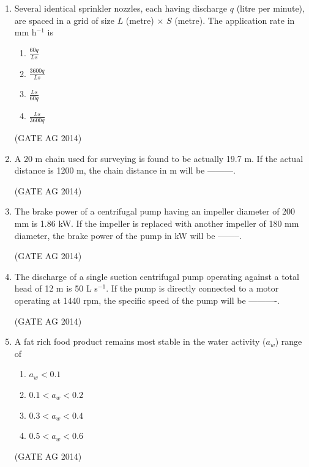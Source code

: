 \documentclass[journal,12pt,onecolumn]{IEEEtran}
\begin{document}
\begin{enumerate}
    \item Several identical sprinkler nozzles, each having discharge $q$ (litre per minute), are spaced in a grid of size $L$ (metre) $\times$ $S$ (metre). The application rate in mm h$^{-1}$ is
    \begin{multicols}{4}
    \begin{enumerate}
        \item $\frac{60  q}{L  s}$
        \item $\frac{3600  q}{L  s}$
        \item $\frac{L  s}{60  q}$
        \item $\frac{L  s}{3600  q}$
    \end{enumerate}
    \end{multicols}
    \hfill(GATE AG 2014)

    \item A 20 m chain used for surveying is found to be actually 19.7 m. If the actual distance is 1200 m, the chain distance in m will be ---------.

    \hfill(GATE AG 2014)

    \item The brake power of a centrifugal pump having an impeller diameter of 200 mm is 1.86 kW. If the impeller is replaced with another impeller of 180 mm diameter, the brake power of the pump in kW will be --------.

    \hfill(GATE AG 2014)

    \item The discharge of a single suction centrifugal pump operating against a total head of 12 m is 50 L s$^{-1}$. If the pump is directly connected to a motor operating at 1440 rpm, the specific speed of the pump will be ----------.

    \hfill(GATE AG 2014)

    \item A fat rich food product remains most stable in the water activity ($a_w$) range of
    \begin{multicols}{4}
    \begin{enumerate}
        \item $a_w < 0.1$
        \item $0.1 < a_w < 0.2$
        \item $0.3 < a_w < 0.4$
        \item $0.5 < a_w < 0.6$
    \end{enumerate}
     \end{multicols}
    \hfill(GATE AG 2014)


\end{enumerate}
\end{document}
